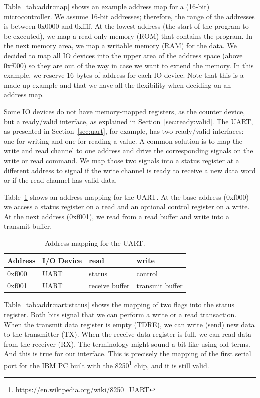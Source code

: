 \documentclass[%
    10pt,
    headinclude, footinclude=false,
    openright, %
    notitlepage,
    cleardoublepage=empty,
    headsepline,
    numbers=noenddot,
    bibliography=totoc, index=totoc,
    ]{scrbook}
\newcommand{\myref}[2]{\href{#1}{#2}}
\renewcommand{\myref}[2]{{#2}{\footnote{\url{#1}}}}
\begin{document}
Table~\ref{tab:addr:map} shows an example address map for a (16-bit) microcontroller.
We assume 16-bit addresses; therefore, the range of the addresses is between 0x0000 and
0xffff.
At the lowest address (the start of the program to be executed), we map a read-only
memory (ROM) that contains the program. In the next memory area, we map
a writable memory (RAM) for the data. We decided to map all IO devices into the
upper area of the address space (above 0xf000) so they are out of the way in case
we want to extend the memory. In this example, we reserve 16 bytes of address for
each IO device. Note that this is a made-up example and that we have all the flexibility when
deciding on an address map.

Some IO devices do not have memory-mapped registers, as the counter device,
but a ready/valid interface, as explained in Section~\ref{sec:ready:valid}.
The UART, as presented in Section~\ref{sec:uart}, for example, has two
ready/valid interfaces: one for writing and one for reading a value.
A common solution is to map the write and read channel to one address and drive
the corresponding signals on the write or read command. We map those two signals into a status register at a different address to signal if the write channel
is ready to receive a new data word or if the read channel has valid data.

Table~\ref{tab:addr:uart} shows an address mapping for the UART. At the base address (0xf000)
we access a status register on a read and an optional control register on a write.
At the next address (0xf001), we read from a read buffer and write into
a transmit buffer.

\begin{table}
\centering
\begin{tabular}{llll}
\toprule
Address & I/O Device & read & write \\
\midrule
0xf000 & UART & status & control \\
0xf001 & UART & receive buffer & transmit buffer \\
\bottomrule
\end{tabular}
\caption{Address mapping for the UART.}
\label{tab:addr:uart}
\end{table}

Table~\ref{tab:addr:uart:status} shows the mapping of two flags into the status register.
Both bits signal that we can perform a write or a read transaction. When the transmit data register
is empty (TDRE), we can write (send) new data to the transmitter (TX).
When the receive data register is full, we can read data from the receiver (RX).
The terminology might sound a bit like using old terms. And this is true for our
interface. This is precisely the mapping of the first serial port for the IBM PC
built with the \myref{https://en.wikipedia.org/wiki/8250_UART}{8250} chip,
and it is still valid.
\end{document}
